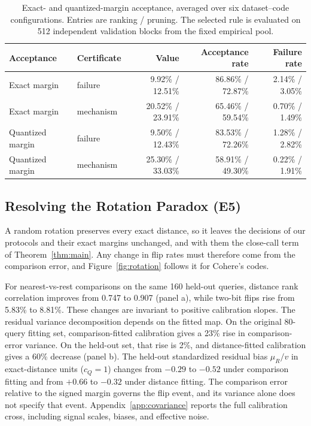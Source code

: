 \documentclass[twoside,11pt]{article}
\begin{document}
\begin{table}[!htbp]
\centering
\small
\setlength{\tabcolsep}{4pt}
\begin{tabular}{llrrr}
\toprule
Acceptance & Certificate & Value & Acceptance rate & Failure rate \\
\midrule
Exact margin & failure & 9.92\% / 12.51\% & 86.86\% / 72.87\% & 2.14\% / 3.05\% \\
Exact margin & mechanism & 20.52\% / 23.91\% & 65.46\% / 59.54\% & 0.70\% / 1.49\% \\
Quantized margin & failure & 9.50\% / 12.43\% & 83.53\% / 72.26\% & 1.28\% / 2.82\% \\
Quantized margin & mechanism & 25.30\% / 33.03\% & 58.91\% / 49.30\% & 0.22\% / 1.91\% \\
\bottomrule
\end{tabular}
\caption{Exact- and quantized-margin acceptance, averaged over six dataset--code configurations. Entries are ranking / pruning. The selected rule is evaluated on 512 independent validation blocks from the fixed empirical pool.}
\label{tab:observable-certificate}
\end{table}

\subsection{Resolving the Rotation Paradox (E5)}
\label{sec:exp-rotation}

A random rotation preserves every exact distance, so it leaves the decisions of our protocols and their exact margins unchanged, and with them the close-call term of Theorem~\ref{thm:main}. Any change in flip rates must therefore come from the comparison error, and Figure~\ref{fig:rotation} follows it for Cohere's codes.

For nearest-vs-rest comparisons on the same 160 held-out queries, distance rank correlation improves from 0.747 to 0.907 (panel a), while two-bit flips rise from 5.83\% to 8.81\%. These changes are invariant to positive calibration slopes. The residual variance decomposition depends on the fitted map. On the original 80-query fitting set, comparison-fitted calibration gives a 23\% rise in comparison-error variance. On the held-out set, that rise is 2\%, and distance-fitted calibration gives a 60\% decrease (panel b). The held-out standardized residual bias $\mu_R/v$ in exact-distance units ($c_Q=1$) changes from $-0.29$ to $-0.52$ under comparison fitting and from $+0.66$ to $-0.32$ under distance fitting. The comparison error relative to the signed margin governs the flip event, and its variance alone does not specify that event. Appendix~\ref{app:covariance} reports the full calibration cross, including signal scales, biases, and effective noise.
\end{document}
